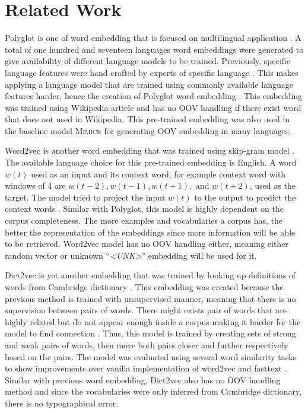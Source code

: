 \chapter{Related Work}
\label{chap:relatedwork}

Polyglot is one of word embedding that is focused on multilingual
application \citep{polyglot2013alrfou}. A total of one hundred and
seventeen languages word embeddings were generated to give
availability of different language models to be trained. Previously,
specific language features were hand crafted by experts of specific
language \citep{polyglot2013alrfou}. This makes applying a language
model that are trained using commonly available language features
harder, hence the creation of Polyglot word embedding
\citep{polyglot2013alrfou}. This embedding was trained using Wikipedia
article and has no OOV handling if there exist word that does not used
in Wikipedia. This pre-trained embedding was also used in the baseline
model \textsc{Mimick} for generating OOV embedding in many languages.

Word2vec is another word embedding that was trained using skip-gram
model \citep{efficient2013mikolov}. The available language choice for
this pre-trained embedding is English. A word $w(t)$ used as an input
and its context word, for example context word with windows of 4 are
$w(t-2), w(t-1), w(t+1),$ and $w(t+2)$, used as the target. The model
tried to project the input $w(t)$ to the output to predict the context
words \citep{efficient2013mikolov}. Similar with Polyglot, this model
is highly dependent on the corpus completeness. The more examples and
vocabularies a corpus has, the better the representation of the
embeddings since more information will be able to be retrieved.
Word2vec model has no OOV handling either, meaning either random
vector or unknown ``\textit{\textless UNK\textgreater}'' embedding
will be used for it.

Dict2vec is yet another embedding that was trained by looking up
definitions of words from Cambridge dictionary
\citep{tissier2017dict2vec}. This embedding was created because the
previous method is trained with unsupervised manner, meaning that
there is no supervision between pairs of words. There might exists
pair of words that are highly related but do not appear enough
inside a corpus making it harder for the model to find connection
\citep{tissier2017dict2vec}. Thus, this model is trained by creating
sets of strong and weak pairs of words, then move both pairs closer
and further respectively based on the pairs. The model was evaluated
using several word similarity tasks to show improvements over vanilla
implementation of word2vec and fasttext \citep{tissier2017dict2vec}.
Similar with previous word embedding, Dict2vec also has no OOV
handling method and since the vocabularies were only inferred from
Cambridge dictionary, there is no typographical error.

